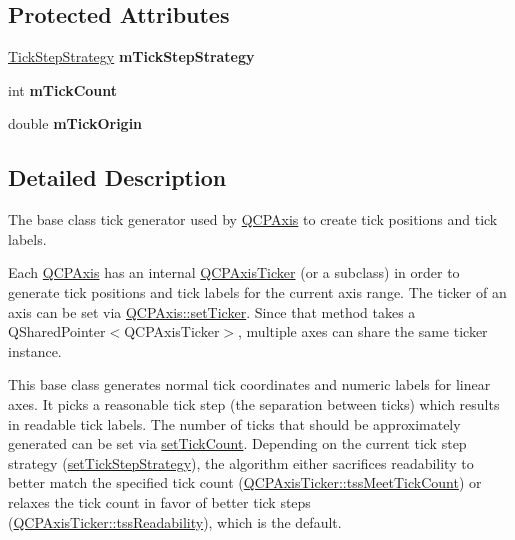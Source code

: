 \subsection*{Protected Attributes}
\begin{DoxyCompactItemize}
\item 
\mbox{\label{classQCPAxisTicker_ac059d6d670b2f6132c593fb4de156701}} 
\hyperlink{classQCPAxisTicker_ab6d2f9d9477821623ac9bc4b21ddf49a}{Tick\+Step\+Strategy} {\bfseries m\+Tick\+Step\+Strategy}
\item 
\mbox{\label{classQCPAxisTicker_a14a35b47d1aad11b08d18ea0e25937b8}} 
int {\bfseries m\+Tick\+Count}
\item 
\mbox{\label{classQCPAxisTicker_a560ef9347b1aa599a9bf0e2f29d3ec16}} 
double {\bfseries m\+Tick\+Origin}
\end{DoxyCompactItemize}


\subsection{Detailed Description}
The base class tick generator used by \hyperlink{classQCPAxis}{Q\+C\+P\+Axis} to create tick positions and tick labels. 

Each \hyperlink{classQCPAxis}{Q\+C\+P\+Axis} has an internal \hyperlink{classQCPAxisTicker}{Q\+C\+P\+Axis\+Ticker} (or a subclass) in order to generate tick positions and tick labels for the current axis range. The ticker of an axis can be set via \hyperlink{classQCPAxis_a4ee03fcd2c74d05cd1a419b9af5cfbdc}{Q\+C\+P\+Axis\+::set\+Ticker}. Since that method takes a {\ttfamily Q\+Shared\+Pointer$<$\+Q\+C\+P\+Axis\+Ticker$>$}, multiple axes can share the same ticker instance.

This base class generates normal tick coordinates and numeric labels for linear axes. It picks a reasonable tick step (the separation between ticks) which results in readable tick labels. The number of ticks that should be approximately generated can be set via \hyperlink{classQCPAxisTicker_a47752abba8293e6dc18491501ae34008}{set\+Tick\+Count}. Depending on the current tick step strategy (\hyperlink{classQCPAxisTicker_a73b1d847c1a12159af6bfda4ebebe7d5}{set\+Tick\+Step\+Strategy}), the algorithm either sacrifices readability to better match the specified tick count (\hyperlink{classQCPAxisTicker_ab6d2f9d9477821623ac9bc4b21ddf49aa770312b6b9b0c64a37ceeba96e0cd7f2}{Q\+C\+P\+Axis\+Ticker\+::tss\+Meet\+Tick\+Count}) or relaxes the tick count in favor of better tick steps (\hyperlink{classQCPAxisTicker_ab6d2f9d9477821623ac9bc4b21ddf49aa9002aa2fd5633ab5556c71a26fed63a8}{Q\+C\+P\+Axis\+Ticker\+::tss\+Readability}), which is the default.

